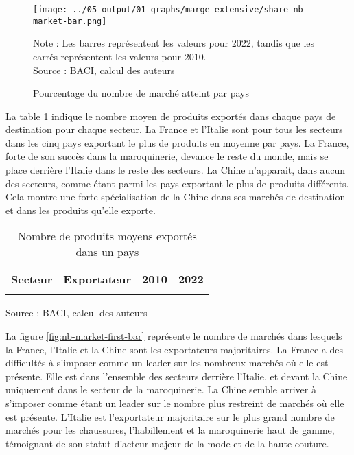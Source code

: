 \documentclass[french,10pt,a4paper]{article}
\begin{document}
\begin{figure}[!h]
  \centering
  \texttt{[image: ../05-output/01-graphs/marge-extensive/share-nb-market-bar.png]}
  \captionsetup{justification=justified, singlelinecheck=false, font=small}
  \caption*{Note : Les barres représentent les valeurs pour 2022, tandis que les carrés représentent les valeurs pour 2010. \\
  Source : BACI, calcul des auteurs}
  \captionsetup{justification=centering, singlelinecheck=true, font=normalsize}
  \caption{Pourcentage du nombre de marché atteint par pays}
  \label{fig:nb-market-bar}
\end{figure}

La table \ref{tab:table-nb-mean-product-export} indique le nombre moyen de produits exportés dans chaque pays de destination pour chaque secteur. La France et l'Italie sont pour tous les secteurs dans les cinq pays exportant le plus de produits en moyenne par pays. La France, forte de son succès dans la maroquinerie, devance le reste du monde, mais se place derrière l'Italie dans le reste des secteurs. La Chine n'apparait, dans aucun des secteurs, comme étant parmi les pays exportant le plus de produits différents. Cela montre une forte spécialisation de la Chine dans ses marchés de destination et dans les produits qu'elle exporte.  

\begin{table}[ht]
  \centering
  \begin{tabular}{|c|c|c|c|}
    \hline
   Secteur & Exportateur & 2010 & 2022 \\
    \hline
    \\
    \hline
  \end{tabular}
  \captionsetup{justification=raggedright,singlelinecheck=false, font=small}
  \caption*{Source : BACI, calcul des auteurs}
  \captionsetup{justification=centering, singlelinecheck=true, font=normalsize}
  \caption{Nombre de produits moyens exportés dans un pays}
  \label{tab:table-nb-mean-product-export}
\end{table}

La figure \ref{fig:nb-market-first-bar} représente le nombre de marchés dans lesquels la France, l'Italie et la Chine sont les exportateurs majoritaires. La France a des difficultés à s'imposer comme un leader sur les nombreux marchés où elle est présente. Elle est dans l'ensemble des secteurs derrière l'Italie, et devant la Chine uniquement dans le secteur de la maroquinerie. La Chine semble arriver à s'imposer comme étant un leader sur le nombre plus restreint de marchés où elle est présente. L'Italie est l'exportateur majoritaire sur le plus grand nombre de marchés pour les chaussures, l'habillement et la maroquinerie haut de gamme, témoignant de son statut d'acteur majeur de la mode et de la haute-couture.
\end{document}
